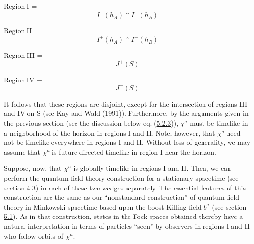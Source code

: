 \documentclass[11pt,a4paper]{article}
\begin{document}
Region I = \begin{equation*}
I^-(h_A) \cap I^+(h_B) \tag{5.3.1a}\label{eq:5.3.1a}
\end{equation*}

Region II = \begin{equation*}
I^+(h_A) \cap I^-(h_B) \tag{5.3.1b}\label{eq:5.3.1b}
\end{equation*}

Region III = \begin{equation*}
J^+(S) \tag{5.3.1c}\label{eq:5.3.1c}
\end{equation*}

Region IV = \begin{equation*}
J^{-}(S) \tag{5.3.1d}\label{eq:5.3.1d}
\end{equation*}

It follows that these regions are disjoint, except for the intersection of regions III and IV on S (see Kay and Wald (1991)). Furthermore, by the arguments given in the previous section (see the discussion below eq. (\hyperref[eq:5.2.3]{5.2.3})), \(\chi^a\) must be timelike in a neighborhood of the horizon in regions I and II. Note, however, that \(\chi^a\) need not be timelike everywhere in regions I and II. Without loss of generality, we may assume that \(\chi^a\) is future-directed timelike in region I near the horizon.

Suppose, now, that \(\chi^a\) is globally timelike in regions I and II. Then, we can perform the quantum field theory construction for a stationary spacetime (see section \hyperlink{sec:4.3}{4.3}) in each of these two wedges separately. The essential features of this construction are the same as our ``nonstandard construction'' of quantum field theory in \hypertarget{source-137}{} Minkowski spacetime based upon the boost Killing field \(b^a\) (see section \hyperlink{sec:5.1}{5.1}). As in that construction, states in the Fock spaces obtained thereby have a natural interpretation in terms of particles ``seen'' by observers in regions I and II who follow orbits of \(\chi^a\).
\end{document}
